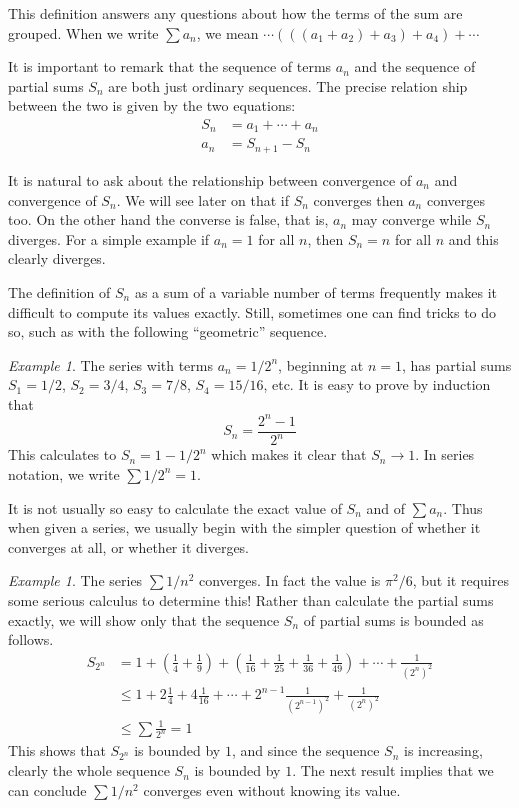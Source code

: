 \documentclass[11pt,oneside]{amsbook}
\theoremstyle{definition}
\theoremstyle{plain}
\theoremstyle{definition}
\theoremstyle{remark}
\newtheorem{example}[thm]{Example}
\numberwithin{equation}{section}
\numberwithin{figure}{section}
\begin{document}
This definition answers any questions about how the terms of the sum are grouped. When we write $\sum a_n$, we mean $\cdots(((a_1+a_2)+a_3)+a_4)+\cdots$

It is important to remark that the sequence of terms $a_n$ and the sequence of partial sums $S_n$ are both just ordinary sequences. The precise relation ship between the two is given by the two equations:
\begin{align*}
  S_n&=a_1+\cdots+a_n\\
  a_n&=S_{n+1}-S_n
\end{align*}

It is natural to ask about the relationship between convergence of $a_n$ and convergence of $S_n$. We will see later on that if $S_n$ converges then $a_n$ converges too. On the other hand the converse is false, that is, $a_n$ may converge while $S_n$ diverges. For a simple example if $a_n=1$ for all $n$, then $S_n=n$ for all $n$ and this clearly diverges.

The definition of $S_n$ as a sum of a variable number of terms frequently makes it difficult to compute its values exactly. Still, sometimes one can find tricks to do so, such as with the following ``geometric'' sequence.

\begin{example}
  \label{ex:geometric}
  The series with terms $a_n=1/2^n$, beginning at $n=1$, has partial sums $S_1=1/2$, $S_2=3/4$, $S_3=7/8$, $S_4=15/16$, etc. It is easy to prove by induction that
  \[S_n=\frac{2^n-1}{2^n}
  \]
  This calculates to $S_n=1-1/2^n$ which makes it clear that $S_n\to1$. In series notation, we write $\sum1/2^n=1$.
\end{example}

It is not usually so easy to calculate the exact value of $S_n$ and of $\sum a_n$. Thus when given a series, we usually begin with the simpler question of whether it converges at all, or whether it diverges.

\begin{example}
  \label{ex:1/n^2}
  The series $\sum1/n^2$ converges. In fact the value is $\pi^2/6$, but it requires some serious calculus to determine this! Rather than calculate the partial sums exactly, we will show only that the sequence $S_n$ of partial sums is bounded as follows. 
  \begin{align*}
    S_{2^n}&=1+\left(\frac14+\frac19\right)
             +\left(\frac1{16}+\frac1{25}+\frac1{36}+\frac1{49}\right)
             +\cdots
             +\frac1{(2^n)^2}\\
           &\leq1+2\frac14+4\frac1{16}
             +\cdots+2^{n-1}\frac1{(2^{n-1})^2}+\frac1{(2^n)^2}\\
           &\leq\sum\frac1{2^n}=1
  \end{align*}
  This shows that $S_{2^n}$ is bounded by $1$, and since the sequence $S_n$ is increasing, clearly the whole sequence $S_n$ is bounded by $1$. The next result implies that we can conclude $\sum1/n^2$ converges even without knowing its value.
\end{example}
\end{document}
